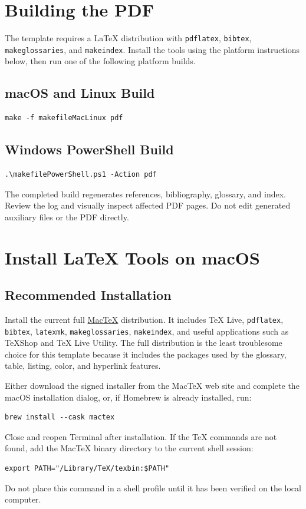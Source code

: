 \section{Building the PDF}
The template requires a LaTeX distribution with \texttt{pdflatex},
\texttt{bibtex}, \texttt{makeglossaries}, and \texttt{makeindex}.
Install the tools using the platform instructions below, then run one of the
following platform builds.

\subsection{macOS and Linux Build}
\begin{verbatim}
make -f makefileMacLinux pdf
\end{verbatim}

\subsection{Windows PowerShell Build}
\begin{verbatim}
.\makefilePowerShell.ps1 -Action pdf
\end{verbatim}
The completed build regenerates references, bibliography, glossary, and index.
Review the log and visually inspect affected PDF pages. Do not edit generated
auxiliary files or the PDF directly.

\section{Install LaTeX Tools on macOS}
\subsection{Recommended Installation}
Install the current full \href{https://www.tug.org/mactex/}{MacTeX}
distribution. It includes TeX Live, \texttt{pdflatex}, \texttt{bibtex},
\texttt{latexmk}, \texttt{makeglossaries}, \texttt{makeindex}, and useful
applications such as TeXShop and TeX Live Utility. The full distribution is the
least troublesome choice for this template because it includes the packages
used by the glossary, table, listing, color, and hyperlink features.

Either download the signed installer from the MacTeX web site and complete the
macOS installation dialog, or, if Homebrew is already installed, run:
\begin{verbatim}
brew install --cask mactex
\end{verbatim}
Close and reopen Terminal after installation. If the TeX commands are not
found, add the MacTeX binary directory to the current shell session:
\begin{verbatim}
export PATH="/Library/TeX/texbin:$PATH"
\end{verbatim}
Do not place this command in a shell profile until it has been verified on the
local computer.

